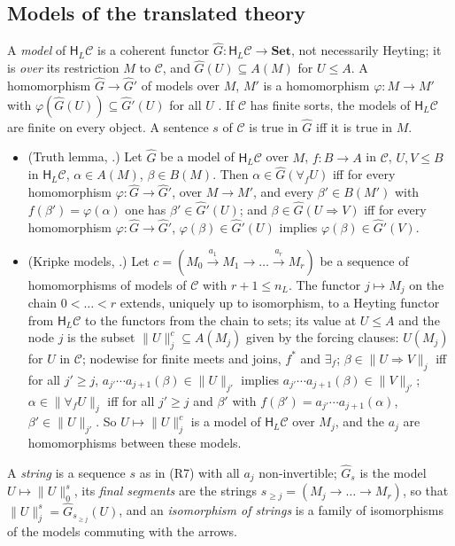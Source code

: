 \documentclass[11pt]{amsart}
\theoremstyle{definition}
\newcommand{\Set}{\mathbf{Set}}
\newcommand{\HH}{\mathsf H}
\newcommand{\cC}{\mathcal C}
\begin{document}
\subsection*{Models of the translated theory}
A \emph{model} of $\HH_L\cC$ is a coherent functor $\hat G\colon
\HH_L\cC\to\Set$, not necessarily Heyting; it is \emph{over} its
restriction $M$ to $\cC$, and $\hat G(U)\subseteq A(M)$ for $U\le A$.
A homomorphism $\hat G\to\hat G'$ of models over $M$, $M'$ is a
homomorphism $\varphi\colon M\to M'$ with $\varphi(\hat G(U))\subseteq
\hat G'(U)$ for all $U$ \cite[\S2]{Finsorts}. If $\cC$ has finite
sorts, the models of $\HH_L\cC$ are finite on every object. A sentence
$s$ of $\cC$ is true in $\hat G$ iff it is true in $M$.
\begin{itemize}
\item[(R6)] (Truth lemma, \cite[Lemma~2.1]{Finsorts}.) Let $\hat G$ be
a model of $\HH_L\cC$ over $M$, $f\colon B\to A$ in $\cC$, $U,V\le B$
in $\HH_L\cC$, $\alpha\in A(M)$, $\beta\in B(M)$. Then $\alpha\in\hat
G(\forall_fU)$ iff for every homomorphism $\varphi\colon\hat G\to\hat
G'$, over $M\to M'$, and every $\beta'\in B(M')$ with $f(\beta')=
\varphi(\alpha)$ one has $\beta'\in\hat G'(U)$; and $\beta\in\hat
G(U\Rightarrow V)$ iff for every homomorphism $\varphi\colon\hat G\to
\hat G'$, $\varphi(\beta)\in\hat G'(U)$ implies $\varphi(\beta)\in\hat
G'(V)$.
\item[(R7)] (Kripke models, \cite[Lemma~2.3]{Interm}.) Let
$c=(M_0\xrightarrow{a_1}M_1\to\dots\xrightarrow{a_r}M_r)$ be a
sequence of homomorphisms of models of $\cC$ with $r+1\le n_L$. The
functor $j\mapsto M_j$ on the chain $0<\dots<r$ extends, uniquely up
to isomorphism, to a Heyting functor from $\HH_L\cC$ to the functors
from the chain to sets; its value at $U\le A$ and the node $j$ is the
subset $\|U\|^c_j\subseteq A(M_j)$ given by the forcing clauses:
$U(M_j)$ for $U$ in $\cC$; nodewise for finite meets and joins, $f^*$
and $\exists_f$; $\beta\in\|U\Rightarrow V\|_j$ iff for all $j'\ge j$,
$a_{j'}\cdots a_{j+1}(\beta)\in\|U\|_{j'}$ implies $a_{j'}\cdots
a_{j+1}(\beta)\in\|V\|_{j'}$; $\alpha\in\|\forall_fU\|_j$ iff for all
$j'\ge j$ and $\beta'$ with $f(\beta')=a_{j'}\cdots a_{j+1}(\alpha)$,
$\beta'\in\|U\|_{j'}$. So $U\mapsto\|U\|^c_j$ is a model of $\HH_L\cC$
over $M_j$, and the $a_j$ are homomorphisms between these models.
\end{itemize}
A \emph{string} is a sequence $s$ as in (R7) with all $a_j$
non-invertible; $\hat G_s$ is the model $U\mapsto\|U\|^s_0$, its
\emph{final segments} are the strings $s_{\ge j}=(M_j\to\dots\to
M_r)$, so that $\|U\|^s_j=\hat G_{s_{\ge j}}(U)$, and an
\emph{isomorphism of strings} is a family of isomorphisms of the
models commuting with the arrows.
\end{document}
